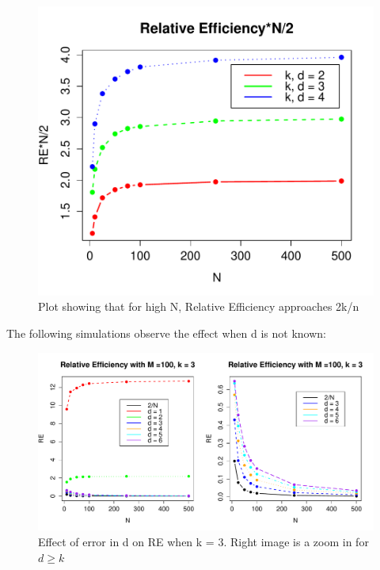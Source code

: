 \documentclass[10pt]{article}
\begin{document}
\begin{figure}[!htb]
	\centering
	\includegraphics[width=12cm]{RPlot03.pdf}
	\caption{ Plot showing that for high N, Relative Efficiency approaches 2k/n}
	\label{fig:plot1}
\end{figure}
\newpage
The following simulations observe the effect when d is not known:
\begin{figure}[!htb]
	\centering
	\includegraphics[width=18cm]{RPlot.pdf}
	\caption{  Effect of error in d on RE when k = 3.  Right image is a zoom in for $d \ge k$}
	\label{fig:plot1}
\end{figure}
\end{document}
